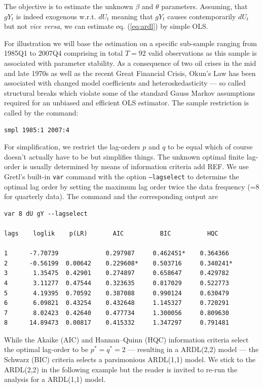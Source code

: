 \documentclass[11pt]{article}
\newcommand{\remph}[1]{{\color{myred}#1}}
\begin{document}
The objective is to estimate the unknown $ \beta $ and $ \theta $ parameters. Assuming, that $ gY_t $ is indeed exogenous w.r.t. $ dU_t $ meaning that $ gY_t $ causes contemporarily $ dU_t $ but not \textit{vice versa}, we can estimate eq. (\ref{eq:ardl}) by simple OLS.

For illustration we will base the estimation on a specific sub-sample ranging from 1985Q1 to 2007Q4 comprising in total $ T=92 $ valid observations as this sample is associated with parameter stability. As a consequence of two oil crises in the mid and late 1970s as well as the recent Great Financial Crisis, Okun's Law has been associated with changed model coefficients and heteroskedasticity --- so called structural breaks which violate some of the standard Gauss Markov assumptions required for an unbiased and efficient OLS estimator. The sample restriction is called by the command:
\begin{verbatim}
smpl 1985:1 2007:4
\end{verbatim}

For simplification, we restrict the lag-orders $ p $ and $ q $ to be equal which of course doesn't actually have to be but simplifies things. The unknown optimal finite lag-order is usually determined by means of information criteria \remph{add REF}. We use Gretl's built-in  \texttt{var} command with the option \texttt{---lagselect} to determine the optimal lag order by setting the maximum lag order twice the data frequency (=8 for quarterly data). The command and the corresponding output are
\begin{Verbatim}[baselinestretch=0.75]
var 8 dU gY --lagselect

lags    loglik    p(LR)       AIC          BIC          HQC

1      -7.70739             0.297987     0.462451*    0.364366 
2      -0.56199  0.00642    0.229608*    0.503716     0.340241*
3       1.35475  0.42901    0.274897     0.658647     0.429782 
4       3.11277  0.47544    0.323635     0.817029     0.522773 
5       4.19395  0.70592    0.387088     0.990124     0.630479 
6       6.09821  0.43254    0.432648     1.145327     0.720291 
7       8.02423  0.42640    0.477734     1.300056     0.809630 
8      14.89473  0.00817    0.415332     1.347297     0.791481 
\end{Verbatim}
While the Akaike (AIC) and Hannan–Quinn (HQC) information criteria select the optimal lag-order to be $ p^\ast = q^\ast = 2 $ --- resulting in a ARDL(2,2) model --- the Schwarz (BIC) criteria selects a parsimonious ARDL(1,1) model. We stick to the ARDL(2,2) in the following example but the reader is invited to re-run the analysis for a ARDL(1,1) model.
\end{document}
